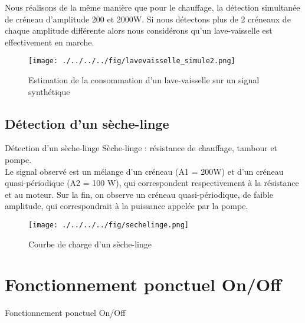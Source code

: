 \documentclass{beamer}
\begin{document}
\begin{frame}
Nous réalisons de la même manière que pour le chauffage, la détection simultanée de créneau d'amplitude  200 et 2000W. Si nous détectons plus de 2 créneaux de chaque amplitude différente alors nous considérons qu'un lave-vaisselle est effectivement en marche.
\end{frame}

\begin{frame}
\begin{figure}[!h]
\begin{center}
\texttt{[image: ./../../../fig/lavevaisselle\_simule2.png]}
\caption{Estimation de la consommation d'un lave-vaisselle sur un signal synthétique}
\label{Figure16}
\end{center}
\end{figure}
\end{frame}

\subsection{Détection d'un sèche-linge}
\begin{frame}{Détection d'un sèche-linge}
Sèche-linge : résistance de chauffage, tambour et pompe.\\
\vspace{0.25cm}
Le signal observé est un mélange d'un créneau (A1 = 200W) et d'un créneau quasi-périodique (A2 = 100 W), qui correspondent respectivement à la résistance et au moteur. Sur la fin, on observe un créneau quasi-périodique, de faible amplitude, qui correspondrait à la puissance appelée par la pompe.
\end{frame}

\begin{frame}
\begin{figure}[!h]
\begin{center}
\texttt{[image: ./../../../fig/sechelinge.png]}
\caption{Courbe de charge d'un sèche-linge}
\label{Figure17}
\end{center}
\end{figure}
\end{frame}

\section{Fonctionnement ponctuel On/Off}

\begin{frame}{Fonctionnement ponctuel On/Off}
\end{frame}
\end{document}
